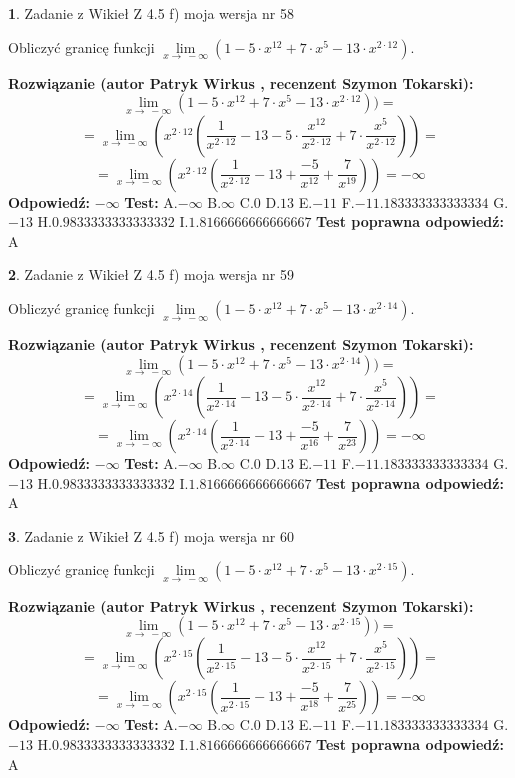 \documentclass[12pt, a4paper]{article}
\theoremstyle{definition} %
\newtheorem{zad}{}
\newcommand{\zadStart}[1]{\begin{zad}#1\newline}
\newcommand{\zadStop}{\end{zad}}
\newcommand{\rozwStart}[2]{\noindent \textbf{Rozwiązanie (autor #1 , recenzent #2): }\newline}
\newcommand{\rozwStop}{\newline}
\newcommand{\odpStart}{\noindent \textbf{Odpowiedź:}\newline}
\newcommand{\odpStop}{\newline}
\newcommand{\testStart}{\noindent \textbf{Test:}\newline}
\newcommand{\testStop}{\newline}
\newcommand{\kluczStart}{\noindent \textbf{Test poprawna odpowiedź:}\newline}
\newcommand{\kluczStop}{\newline}
\begin{document}
\zadStart{Zadanie z Wikieł Z 4.5 f) moja wersja nr 58}


Obliczyć granicę funkcji  $\lim\limits_{x\to\ -\infty}(1 - 5 \cdot x^{12}+7 \cdot x^{5}- 13 \cdot x^{2\cdot12})$.
\zadStop
\rozwStart{Patryk Wirkus}{Szymon Tokarski}
$$\lim\limits_{x\to\ -\infty}(1 - 5 \cdot x^{12}+7 \cdot x^{5}- 13 \cdot x^{2\cdot12}))=$$
$$=\lim\limits_{x\to\ -\infty}(x^{2\cdot12}(\frac{1}{x^{2\cdot12}}-13 -5 \cdot \frac{x^{12}}{x^{2\cdot12}}+7 \cdot \frac{x^{5}}{x^{2\cdot12}}))=$$
$$=\lim\limits_{x\to\ -\infty}(x^{2\cdot12}(\frac{1}{x^{2\cdot12}}-13 + \frac{-5}{x^{12}}+ \frac{7}{x^{19}}))=-\infty$$
\rozwStop
\odpStart
$-\infty$
\odpStop
\testStart
A.$-\infty$ B.$\infty$ C.$0$ D.$13$ E.$-11$
F.$-11.183333333333334$ G.$-13$
H.$0.9833333333333332$
I.$1.8166666666666667$
\testStop
\kluczStart
A
\kluczStop



\zadStart{Zadanie z Wikieł Z 4.5 f) moja wersja nr 59}


Obliczyć granicę funkcji  $\lim\limits_{x\to\ -\infty}(1 - 5 \cdot x^{12}+7 \cdot x^{5}- 13 \cdot x^{2\cdot14})$.
\zadStop
\rozwStart{Patryk Wirkus}{Szymon Tokarski}
$$\lim\limits_{x\to\ -\infty}(1 - 5 \cdot x^{12}+7 \cdot x^{5}- 13 \cdot x^{2\cdot14}))=$$
$$=\lim\limits_{x\to\ -\infty}(x^{2\cdot14}(\frac{1}{x^{2\cdot14}}-13 -5 \cdot \frac{x^{12}}{x^{2\cdot14}}+7 \cdot \frac{x^{5}}{x^{2\cdot14}}))=$$
$$=\lim\limits_{x\to\ -\infty}(x^{2\cdot14}(\frac{1}{x^{2\cdot14}}-13 + \frac{-5}{x^{16}}+ \frac{7}{x^{23}}))=-\infty$$
\rozwStop
\odpStart
$-\infty$
\odpStop
\testStart
A.$-\infty$ B.$\infty$ C.$0$ D.$13$ E.$-11$
F.$-11.183333333333334$ G.$-13$
H.$0.9833333333333332$
I.$1.8166666666666667$
\testStop
\kluczStart
A
\kluczStop



\zadStart{Zadanie z Wikieł Z 4.5 f) moja wersja nr 60}


Obliczyć granicę funkcji  $\lim\limits_{x\to\ -\infty}(1 - 5 \cdot x^{12}+7 \cdot x^{5}- 13 \cdot x^{2\cdot15})$.
\zadStop
\rozwStart{Patryk Wirkus}{Szymon Tokarski}
$$\lim\limits_{x\to\ -\infty}(1 - 5 \cdot x^{12}+7 \cdot x^{5}- 13 \cdot x^{2\cdot15}))=$$
$$=\lim\limits_{x\to\ -\infty}(x^{2\cdot15}(\frac{1}{x^{2\cdot15}}-13 -5 \cdot \frac{x^{12}}{x^{2\cdot15}}+7 \cdot \frac{x^{5}}{x^{2\cdot15}}))=$$
$$=\lim\limits_{x\to\ -\infty}(x^{2\cdot15}(\frac{1}{x^{2\cdot15}}-13 + \frac{-5}{x^{18}}+ \frac{7}{x^{25}}))=-\infty$$
\rozwStop
\odpStart
$-\infty$
\odpStop
\testStart
A.$-\infty$ B.$\infty$ C.$0$ D.$13$ E.$-11$
F.$-11.183333333333334$ G.$-13$
H.$0.9833333333333332$
I.$1.8166666666666667$
\testStop
\kluczStart
A
\kluczStop
\end{document}
